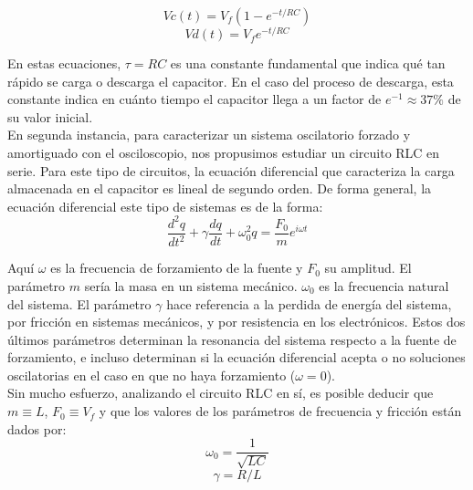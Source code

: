 \documentclass[%
 reprint,
 amsmath,amssymb,
 aps,
]{revtex4-1}
\begin{document}
\begin{equation}
Vc(t) = V_f(1-e^{-t/{RC}})
\end{equation}
\begin{equation}
Vd(t) = V_fe^{-t/{RC}}
\end{equation}

En estas ecuaciones, $\tau = RC$ es una constante fundamental que indica qu\'e tan r\'apido se carga o descarga el capacitor. En el caso del proceso de descarga, esta constante indica en cu\'anto tiempo el capacitor llega a un factor de $e^{-1} \approx 37\% $ de su valor inicial. \\

En segunda instancia, para caracterizar un sistema oscilatorio forzado y amortiguado con el osciloscopio, nos propusimos estudiar un circuito RLC en serie. Para este tipo de circuitos, la ecuación diferencial que caracteriza la carga almacenada en el capacitor es lineal de segundo orden. De forma general, la ecuación diferencial este tipo de sistemas es de la forma:\\

\begin{equation}
\frac{d^2q}{dt^2} + \gamma\frac{dq}{dt} + \omega_0^2q = \frac{F_0}{m}e^{i\omega t}
\end{equation}

Aqu\'i $\omega$ es la frecuencia de forzamiento de la fuente y $F_0$ su amplitud. El par\'ametro $m$ ser\'ia la masa en un sistema mec\'anico. $\omega_0$ es la frecuencia natural del sistema. El par\'ametro $\gamma$ hace referencia a la perdida de energ\'ia del sistema, por fricci\'on en sistemas mec\'anicos, y por resistencia en los electr\'onicos. Estos dos \'ultimos par\'ametros determinan la resonancia del sistema respecto a la fuente de forzamiento, e incluso determinan si la ecuaci\'on diferencial acepta o no soluciones oscilatorias en el caso en que no haya forzamiento ($\omega = 0$).\\

Sin mucho esfuerzo, analizando el circuito RLC en s\'i, es posible deducir que $m \equiv L$, $F_0 \equiv V_f$ y que los valores de los parámetros de frecuencia y fricci\'on están dados por:\\

\begin{equation}
\omega_0 = \frac{1}{\sqrt{LC}}
\end{equation}
\begin{equation}
\gamma = R/L
\end{equation}
\end{document}
